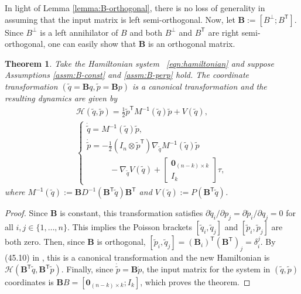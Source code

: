 \documentclass[journal,twoside,web]{ieeecolor}
\newtheorem{thm}{Theorem}%
\newcommand*{\tpose}{^\mathsf{T}}
\newcommand*{\Minv}{M^\mathsf{-1}}
\newcommand*{\Id}[1]{I_{#1}}
\newcommand*{\Zmat}[1]{\bm{0}_{#1}}
\newcommand*{\simpleB}{\begin{bmatrix}\Zmat{(n-k)\times k}\\ \Id{k}\end{bmatrix}}
\begin{document}
In light of Lemma \ref{lemma:B-orthogonal}, there is no loss of generality in
assuming that the input matrix is left semi-orthogonal.
Now, let \(\mathbf{B} := [B^\perp; B\tpose]\).
Since \(B^\perp\) is a left annihilator of \(B\) and both \(B^\perp\) and
\(B\tpose\) are right semi-orthogonal, one can easily show that \(\mathbf{B}\) is
an orthogonal matrix.

\begin{thm}\label{thm:simply-actuated}
    Take the Hamiltonian system ~\eqref{eqn:hamiltonian} and suppose
    Assumptions \ref{assm:B-const} and \ref{assm:B-perp} hold.
    The coordinate transformation
    \(\left(\tilde{q} = \mathbf{B}q, \tilde{p} = \mathbf{B}p\right)\)
    is a canonical transformation and the resulting dynamics are given by 
    \begin{gather}\label{eqn:simple-hamiltonian}
        \mathcal{H}(\tilde{q},\tilde{p}) = 
        \frac{1}{2} \tilde{p}\tpose \Minv(\tilde{q}) \tilde{p} + V(\tilde{q})
        , \\
       \begin{cases}
           \dot{\tilde{q}} = \Minv(\tilde{q})\tilde{p}
           , \\
           \dot{\tilde{p}} = -\frac{1}{2} (\Id{n} \otimes \tilde{p}\tpose)
           \nabla_{\tilde{q}} \Minv(\tilde{q}) \tilde{p} \\
           \phantom{---} - \nabla_{\tilde{q}} V(\tilde{q}) + \simpleB \tau
            ,
        \end{cases} \nonumber
    \end{gather}
    where 
    \(\Minv(\tilde{q}) := 
    \mathbf{B}D^{-1}(\mathbf{B}\tpose \tilde{q})\mathbf{B}\tpose\)
    and
    \(V(\tilde{q}) := P(\mathbf{B}\tpose \tilde{q})\).
\end{thm}
\begin{proof}
    Since \(\mathbf{B}\) is constant, this transformation satisfies
    \(\partial\tilde{q}_i/\partial p_j = \partial\tilde{p}_i/\partial q_j = 0\) for all 
    \(i,j \in \{1,\ldots,n\}\).
    This implies the Poisson brackets \([\tilde{q}_i, \tilde{q}_j]\)
    and \([\tilde{p}_i,\tilde{p}_j]\) are both zero.
    Then, since \(\mathbf{B}\) is orthogonal, 
    \([\tilde{p}_i, \tilde{q}_j] = (\mathbf{B}_i)\tpose (\mathbf{B}\tpose)_j
        = \delta_i^j\).
    By (45.10) in \cite{landau_mechanics}, this is a canonical transformation
    and the new Hamiltonian is
    \(\mathcal{H}(\mathbf{B}\tpose \tilde{q}, \mathbf{B}\tpose \tilde{p})\).
    Finally, since \(\dot{\tilde{p}} = \mathbf{B} \dot{p}\), the input
    matrix for the system in \((\tilde{q},\tilde{p})\) coordinates is
    \(\mathbf{B}B = [\Zmat{(n-k)\times k}; \Id{k}]\), which proves the theorem.
\end{proof}
\end{document}
